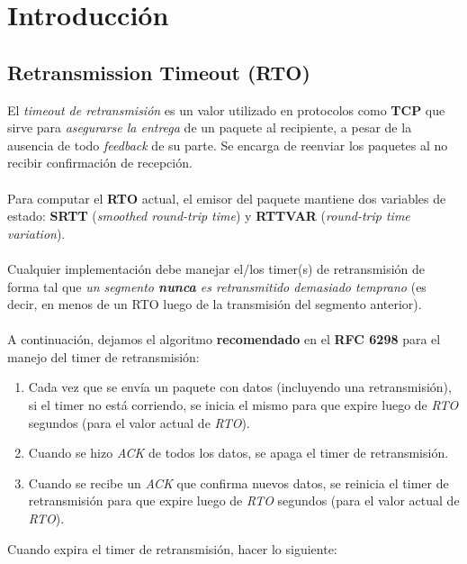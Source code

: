 \section{Introducción}

\subsection{Retransmission Timeout (RTO)}

El \textit{timeout de retransmisión} es un valor utilizado en protocolos 
como \textbf{TCP} que sirve para \textit{asegurarse la entrega} de un paquete al
recipiente, a pesar de la ausencia de todo \textit{feedback} de su parte. Se 
encarga de reenviar los paquetes al no recibir confirmación de recepción.\\
\\
\indent Para computar el \textbf{RTO} actual, el emisor del paquete mantiene dos
variables
de estado: \textbf{SRTT} (\textit{smoothed round-trip time}) y \textbf{RTTVAR}
(\textit{round-trip time variation}).\\
\\
\indent Cualquier implementación debe manejar el/los timer(s) de retransmisión
de forma tal que \textit{un segmento \textbf{nunca} es retransmitido demasiado
temprano} (es decir, en menos de un RTO luego de la transmisión del segmento
anterior).\\
\\
\indent A continuación, dejamos el algoritmo \textbf{recomendado} en el
\textbf{RFC 6298} para el manejo del timer de retransmisión:
\begin{enumerate}
 \item Cada vez que se envía un paquete con datos (incluyendo una
	retransmisión), si el timer no está corriendo, se inicia el mismo para
	que expire luego de \textit{RTO} segundos (para el valor actual de
	\textit{RTO}).
 \item Cuando se hizo \textit{ACK} de todos los datos, se apaga el timer de
	retransmisión.
 \item Cuando se recibe un \textit{ACK} que confirma nuevos datos, se reinicia
	el timer de retransmisión para que expire luego de \textit{RTO}
	segundos (para el valor actual de \textit{RTO}).
\end{enumerate}
Cuando expira el timer de retransmisión, hacer lo siguiente:

